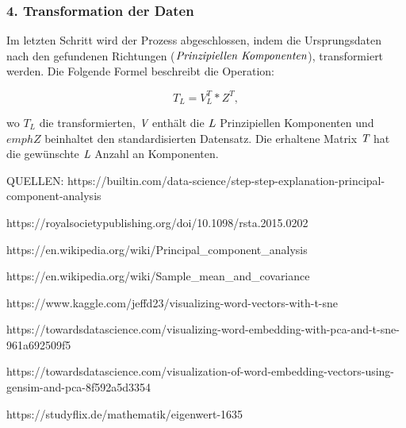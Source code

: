 \subsubsection{4. Transformation der Daten}

Im letzten Schritt wird der Prozess abgeschlossen, indem die Ursprungsdaten nach den gefundenen Richtungen ($\emph{Prinzipiellen Komponenten}$), transformiert werden. Die Folgende Formel beschreibt die Operation:

\begin{equation}\label{transPCA}
	T_{L} = V^T_L * Z^T,
\end{equation}  

wo $T_{L}$ die transformierten, $\emph{V}$ enthält die $\emph{L}$ Prinzipiellen Komponenten und $emph{Z}$ beinhaltet den standardisierten Datensatz. Die erhaltene Matrix $\emph{T}$ hat die gewünschte $\emph{L}$ Anzahl an Komponenten. 


QUELLEN:
https://builtin.com/data-science/step-step-explanation-principal-component-analysis

https://royalsocietypublishing.org/doi/10.1098/rsta.2015.0202

https://en.wikipedia.org/wiki/Principal_component_analysis

https://en.wikipedia.org/wiki/Sample_mean_and_covariance

https://www.kaggle.com/jeffd23/visualizing-word-vectors-with-t-sne

https://towardsdatascience.com/visualizing-word-embedding-with-pca-and-t-sne-961a692509f5

https://towardsdatascience.com/visualization-of-word-embedding-vectors-using-gensim-and-pca-8f592a5d3354

https://studyflix.de/mathematik/eigenwert-1635




